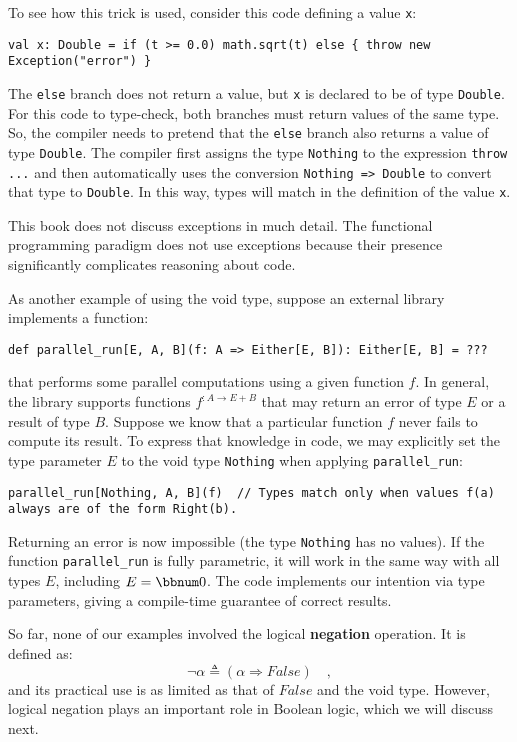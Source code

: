 To see how this trick is used, consider this code defining a value
\lstinline!x!:
\begin{lstlisting}
val x: Double = if (t >= 0.0) math.sqrt(t) else { throw new Exception("error") }
\end{lstlisting}
The \lstinline!else! branch does not return a value, but \lstinline!x!
is declared to be of type \lstinline!Double!. For this code to type-check,
both branches must return values of the same type. So, the compiler
needs to pretend that the \lstinline!else! branch also returns a
value of type \lstinline!Double!. The compiler first assigns the
type \lstinline!Nothing! to the expression \lstinline!throw ...!
and then automatically uses the conversion \lstinline!Nothing => Double!
to convert that type to \lstinline!Double!. In this way, types will
match in the definition of the value \lstinline!x!. 

This book does not discuss exceptions in much detail. The functional
programming paradigm does not use exceptions because their presence
significantly complicates reasoning about code.

As another example of using the void type, suppose an external library
implements a function:
\begin{lstlisting}
def parallel_run[E, A, B](f: A => Either[E, B]): Either[E, B] = ???
\end{lstlisting}
that performs some parallel computations using a given function $f$.
In general, the library supports functions $f^{:A\rightarrow E+B}$
that may return an error of type $E$ or a result of type $B$. Suppose
we know that a particular function $f$ never fails to compute its
result. To express that knowledge in code, we may explicitly set the
type parameter $E$ to the void type \lstinline!Nothing! when applying
\lstinline!parallel_run!:
\begin{lstlisting}
parallel_run[Nothing, A, B](f)  // Types match only when values f(a) always are of the form Right(b). 
\end{lstlisting}
Returning an error is now impossible (the type \lstinline!Nothing!
has no values). If the function \lstinline!parallel_run! is fully
parametric, it will work in the same way with all types $E$, including
$E=\bbnum 0$. The code implements our intention via type parameters,
giving a compile-time guarantee of correct results.

So far, none of our examples involved the logical \textbf{negation}
operation. It is defined as:
\[
\neg\alpha\triangleq(\alpha\Rightarrow False)\quad,
\]
and its practical use is as limited as that of $False$ and the void
type. However, logical negation plays an important role in Boolean
logic, which we will discuss next.

